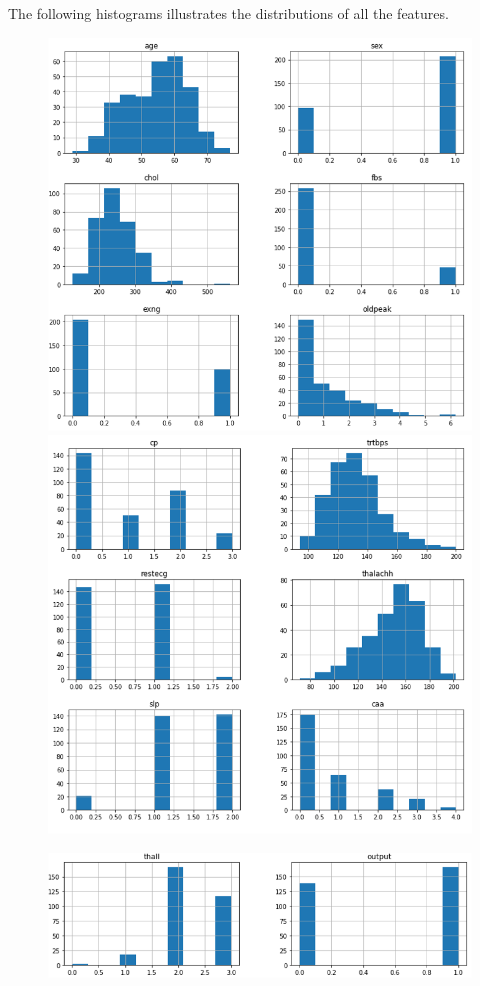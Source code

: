 \documentclass[11pt, oneside]{article}
\begin{document}
\noindent
The following histograms illustrates the distributions of all the features. 
\begin{figure}[H]
    \centering
    \includegraphics[width=13cm]{Data1.png}
    \includegraphics[width=13cm]{Data2.png}
\end{figure}
\begin{figure}[H]
    \centering
    \includegraphics[width=13cm]{Data3.png}
\end{figure}
\end{document}
